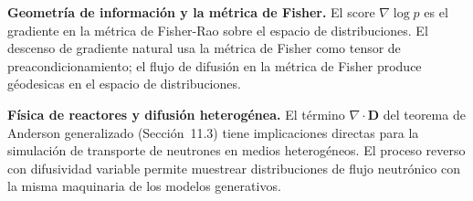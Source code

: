 \textbf{Geometría de información y la métrica de Fisher.} El score $\nabla\log p$
es el gradiente en la métrica de Fisher-Rao sobre el espacio de distribuciones.
El descenso de gradiente natural usa la métrica de Fisher como tensor de
preacondicionamiento; el flujo de difusión en la métrica de Fisher produce
géodesicas en el espacio de distribuciones.

\textbf{Física de reactores y difusión heterogénea.} El término $\nabla\cdot\bm{D}$
del teorema de Anderson generalizado (Sección~11.3) tiene implicaciones directas
para la simulación de transporte de neutrones en medios heterogéneos. El proceso
reverso con difusividad variable permite muestrear distribuciones de flujo
neutrónico con la misma maquinaria de los modelos generativos.

\label{sec:estrella12}
